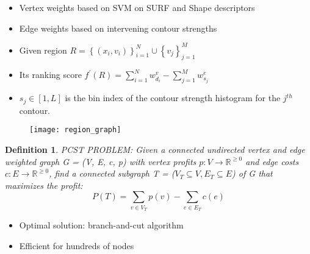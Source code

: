\documentclass[11pt, a4paper, landscape]{article}
\newtheorem{definition}{Definition}
\begin{document}
\NewPage{}
\vfill
\begin{itemize}
\item Vertex weights based on SVM on SURF and Shape descriptors
\item Edge weights based on intervening contour strengths
\item Given region $R = \left\lbrace (x_i, v_i) \right\rbrace _{i = 1} ^N \cup \left\lbrace v_j \right\rbrace _{j = 1} ^M$
\item Its ranking score $f^{\prime}(R) = \sum\limits_{i = 1}^{N}w^v_{d_i} - \sum\limits_{j = 1}^{M} w^e_{s_j}$
\item $s_j \in \left[ 1, L \right] $ is the bin index of the contour strength histogram for the $j^{th}$ contour.
\end{itemize}
\begin{figure}
	\centering
	\texttt{[image: region\_graph]}
\end{figure}
\vfill


\NewPage{}
\vfill
\begin{definition}
PCST PROBLEM: Given a connected undirected vertex and edge weighted graph G = (V, E, c, p) with vertex profits $p: V \rightarrow \mathbb{R}^{\geq 0}$ and edge costs $c: E \rightarrow \mathbb{R}^{\geq 0}$, find a connected subgraph T = ($V_T \subseteq V, E_T \subseteq E$) of G that maximizes the profit:
\begin{equation}
P(T) = \sum\limits_{v \in V_T} p(v) - \sum\limits_{e \in E_T} c(e)
\end{equation}
\end{definition}
\begin{itemize}
\item Optimal solution: branch-and-cut algorithm
\item Efficient for hundreds of nodes
\end{itemize}
\vfill
\end{document}
